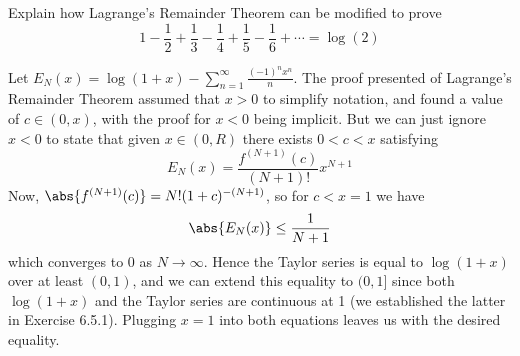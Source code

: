 \begin{exercise}
  Explain how Lagrange's Remainder Theorem can be modified to prove
  $$
  1-\frac{1}{2}+\frac{1}{3}-\frac{1}{4}+\frac{1}{5}-\frac{1}{6}+\cdots=\log (2)
  $$
\end{exercise}
\begin{solution}
  Let \(E_N(x) = \log(1+x) - \sum_{n=1}^\infty \frac {(-1)^n x^n}{n}\).
  The proof presented of Lagrange's Remainder Theorem assumed that \(x > 0\) to simplify notation, and found a value of \(c \in (0, x)\), with the proof for \(x < 0\) being implicit. But we can just ignore \(x < 0\) to state that given \(x \in (0, R)\) there exists \(0 < c < x\) satisfying
  \[E_N(x) = \frac{f^{(N+1)}(c)}{(N+1)!}x^{N+1}\]
Now, \(\abs{f^{(N+1)}(c)} = N!(1+c)^{-(N+1)}\), so for \(c < x = 1\) we have
\[\abs{E_N(x)} \leq \frac{1}{N+1}\]
which converges to 0 as \(N \to \infty\). Hence the Taylor series is equal to \(\log(1+x)\) over at least \((0,1)\), and we can extend this equality to \((0, 1]\) since both \(\log(1+x)\) and the Taylor series are continuous at 1 (we established the latter in Exercise 6.5.1). Plugging \(x = 1\) into both equations leaves us with the desired equality.
\end{solution}

